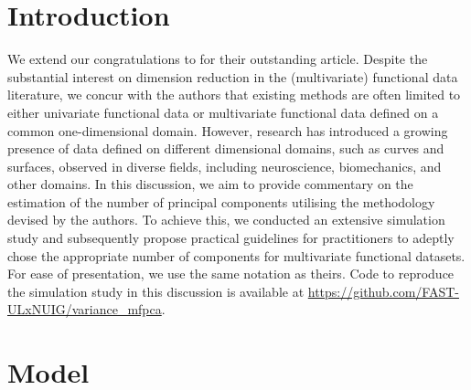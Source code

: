 
\section{Introduction} %
\label{sec:introduction}

We extend our congratulations to \cite{happMultivariateFunctionalPrincipal2018} for their outstanding article. Despite the substantial interest on dimension reduction in the (multivariate) functional data literature, we concur with the authors that existing methods are often limited to either univariate functional data or multivariate functional data defined on a common one-dimensional domain. However, research has introduced a growing presence of data defined on different dimensional domains, such as curves and surfaces, observed in diverse fields, including neuroscience, biomechanics, and other domains. In this discussion, we aim to provide commentary on the estimation of the number of principal components utilising the methodology devised by the authors. To achieve this, we conducted an extensive simulation study and subsequently propose practical guidelines for practitioners to adeptly chose the appropriate number of components for multivariate functional datasets. For ease of presentation, we use the same notation as theirs. Code to reproduce the simulation study in this discussion is available at \url{https://github.com/FAST-ULxNUIG/variance_mfpca}.


\section{Model} %
\label{sec:model}

